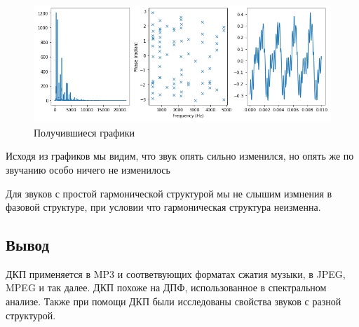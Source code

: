 \begin{figure}[H]
	\begin{center}
		\includegraphics[scale=0.66]{fig/lab06/lab06_18.png}
		\caption{Получившиеся графики}
	\end{center}
\end{figure}

Исходя из графиков мы видим, что звук опять сильно изменился, но опять же по звучанию особо ничего не изменилось

Для звуков с простой гармонической структурой мы не слышим измнения в фазовой структуре, при условии что гармоническая структура неизменна.


\subsection{Вывод}

ДКП применяется в MP3 и соответвующих форматах сжатия музыки, в JPEG, MPEG и так далее. ДКП похоже на ДПФ, использованное в спектральном анализе. Также при помощи ДКП были исследованы свойства звуков с разной структурой.